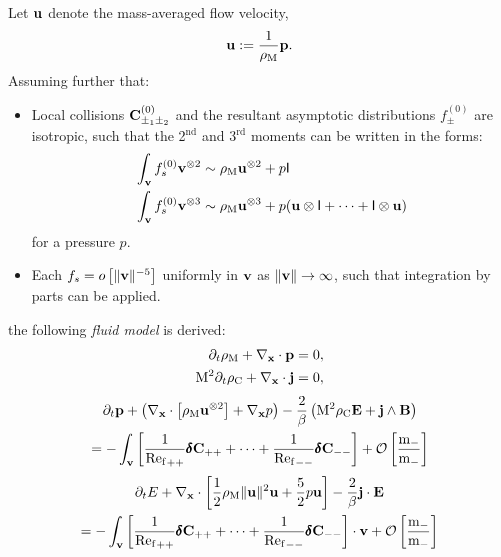     Let $\mathbf{u}$ denote the mass-averaged flow velocity,
    \begin{equation}
        \mathbf{u}  :=  \frac{1}{\rho_{\mathrm{M}}}\mathbf{p}.
    \end{equation}
    Assuming further that:
    \begin{itemize}
        \item  Local collisions $\mathbf{C}_{\pm_{1}\pm_{2}}^{(0)}$ and the resultant asymptotic distributions $f_{\pm}^{(0)}$ are isotropic, such that the 2$^{\text{nd}}$ and 3$^{\text{rd}}$ moments can be written in the forms:
        \begin{align}
            \int_{\mathbf{v}}f_{s}^{(0)}\mathbf{v}^{\otimes 2}  &\sim  \rho_{\mathrm{M}}\mathbf{u}^{\otimes 2} + p\mathsf{I}  \label{eqn:isotropic 2nd moment}  \\
            \int_{\mathbf{v}}f_{s}^{(0)}\mathbf{v}^{\otimes 3}  &\sim  \rho_{\mathrm{M}}\mathbf{u}^{\otimes 3} + p(\mathbf{u}\otimes\mathsf{I} + \cdots + \mathsf{I}\otimes\mathbf{u})  \label{eqn:isotropic 3rd moment}
        \end{align}
        for a pressure $p$. 
        \item  Each $f_{s}  =  o\left[\|\mathbf{v}\|^{- 5}\right]$ uniformly in $\mathbf{v}$ as $\|\mathbf{v}\|  \rightarrow  \infty$, such that integration by parts can be applied.
    \end{itemize}
    the following \emph{fluid model} is derived:
    \begin{align}
        \partial_{t}\rho_{\mathrm{M}} + \nabla_{\mathbf{x}}\cdot\mathbf{p}  &=  0,  \label{eqn:mass conservation introduction}  \\
        \mathrm{M}^{2}\partial_{t}\rho_{\mathrm{C}} + \nabla_{\mathbf{x}}\cdot\mathbf{j}  &=  0,
    \end{align}
    \vspace{-25pt}
    \begin{multline}
        \partial_{t}\mathbf{p} + \left(\nabla_{\mathbf{x}}\cdot\left[\rho_{\mathrm{M}}\mathbf{u}^{\otimes 2}\right] + \nabla_{\mathbf{x}}p\right) - \frac{2}{\beta}\left(\mathrm{M}^{2}\rho_{\mathrm{C}}\mathbf{E} + \mathbf{j}\wedge\mathbf{B}\right)  \\
        =  - \int_{\mathbf{v}}\left[\frac{1}{{\mathrm{Re}_{\mathrm{f}}}_{++}}\pmb{\mathsf{\delta}}\mathbf{C}_{++} + \cdots + \frac{1}{{\mathrm{Re}_{\mathrm{f}}}_{--}}\pmb{\mathsf{\delta}}\mathbf{C}_{--}\right] + \mathcal{O}\left[\frac{\mathrm{m}_{-}}{\mathrm{m}_{-}}\right]
    \end{multline}
    \vspace{-15pt}
    \begin{multline}
        \partial_{t}E + \nabla_{\mathbf{x}}\cdot\left[\frac{1}{2}\rho_{\mathrm{M}}\|\mathbf{u}\|^{2}\mathbf{u} + \frac{5}{2}p\mathbf{u}\right] - \frac{2}{\beta}\mathbf{j}\cdot\mathbf{E}  \\
        =  - \int_{\mathbf{v}}\left[\frac{1}{{\mathrm{Re}_{\mathrm{f}}}_{++}}\pmb{\mathsf{\delta}}\mathbf{C}_{++} + \cdots + \frac{1}{{\mathrm{Re}_{\mathrm{f}}}_{--}}\pmb{\mathsf{\delta}}\mathbf{C}_{--}\right]\cdot\mathbf{v} + \mathcal{O}\left[\frac{\mathrm{m}_{-}}{\mathrm{m}_{-}}\right]
    \end{multline}
